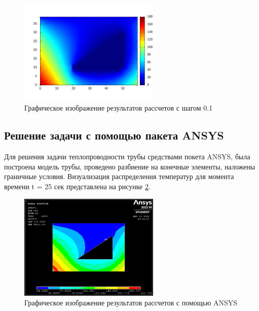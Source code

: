 \documentclass[12pt, a4paper]{article}
\begin{document}
	\begin{figure}[h]
		\centering    %
		\includegraphics[width=0.6\textwidth]{static/heatmap.png}
		\caption{Графическое изображение результатов рассчетов с шагом 0.1} %
		\label{fig:pic2} %
	\end{figure}

    \subsection{Решение задачи с помощью пакета ANSYS}
    Для решения задачи теплопроводности трубы средствами покета ANSYS, была построена модель трубы, проведено разбиение на конечные элементы, наложены граничные условия. Визуализация распределения температур для момента времени t = 25 сек представлена на рисунке \ref{fig:pic4}.
    
    \begin{figure}[h]
    	\centering    %
    	\includegraphics[width=0.6\textwidth]{static/AnsysResult.jpg}
    	\caption{Графическое изображение результатов рассчетов с помощью ANSYS} %
    	\label{fig:pic4} %
    \end{figure}
\end{document}
